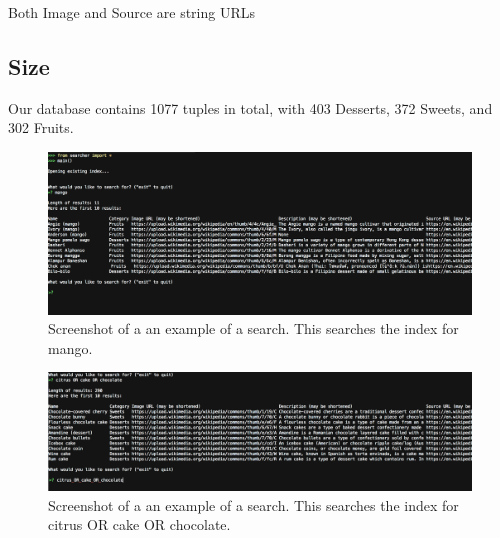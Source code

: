 \documentclass[12pt, oneside]{scrreprt}
\begin{document}
Both Image and Source are string URLs

\subsection*{Size}
Our database contains 1077 tuples in total, with 403 Desserts, 372 Sweets, and 302 Fruits.
\begin{figure}
    \centering
    \includegraphics[width=\linewidth]{screenshotTwo.png}
    \caption{Screenshot of a an example of a search. This searches the index for mango.}
    \label{fig:my_label}
\end{figure}
\begin{figure}
    \centering
    \includegraphics[width=\linewidth]{screenshotOne.png}
    \caption{Screenshot of a an example of a search. This searches the index for citrus OR cake OR chocolate.}
    \label{fig:my_label}
\end{figure}
\end{document}
